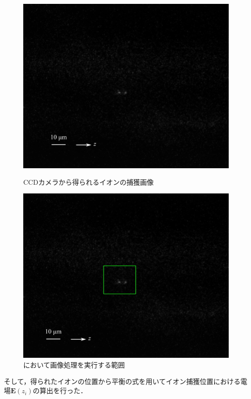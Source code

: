 \begin{figure}[h]
	\begin{minipage}{0.48\linewidth}
		\begin{center}
			\includegraphics[width=0.6\columnwidth]{./methods/figure/raw_image.png}
			\caption{CCDカメラから得られるイオンの捕獲画像}
			\label{fig:raw_image}
		\end{center}
	\end{minipage}
	\begin{minipage}{0.48\linewidth}
		\begin{center}
			\includegraphics[width=0.6\columnwidth]{./methods/figure/rect_image.png}
			\caption{において画像処理を実行する範囲}
			\label{fig:rect_image}
		\end{center}
	\end{minipage}
\end{figure}

そして，得られたイオンの位置から平衡の式を用いてイオン捕獲位置における電場$\bm{E}(z_{i})$の算出を行った．

